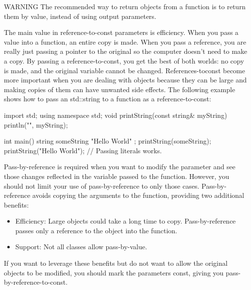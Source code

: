 \begin{myWarning}{WARNING}
The recommended way to return objects from a function is to return them by value, instead of using output parameters.
\end{myWarning}


The main value in reference-to-const parameters is efficiency. When you pass a value into a function, an entire copy is made. When you pass a reference, you are really just passing a pointer to the original so the computer doesn’t need to make a copy. By passing a reference-to-const, you get the best of both worlds: no copy is made, and the original variable cannot be changed. References-toconst become more important when you are dealing with objects because they can be large and making copies of them can have unwanted side effects. The following example shows how to pass an std::string to a function as a reference-to-const:

\begin{cpp}
import std;
using namespace std;
void printString(const string& myString) { println("{}", myString); }

int main()
{
    string someString { "Hello World" };
    printString(someString);
    printString("Hello World"); // Passing literals works.
}
\end{cpp}


Pass-by-reference is required when you want to modify the parameter and see those changes reflected in the variable passed to the function. However, you should not limit your use of pass-by-reference to only those cases. Pass-by-reference avoids copying the arguments to the function, providing two additional benefits:

\begin{itemize}
\item
Efficiency: Large objects could take a long time to copy. Pass-by-reference passes only a reference to the object into the function.

\item
Support: Not all classes allow pass-by-value.
\end{itemize}

If you want to leverage these benefits but do not want to allow the original objects to be modified, you should mark the parameters const, giving you pass-by-reference-to-const.

